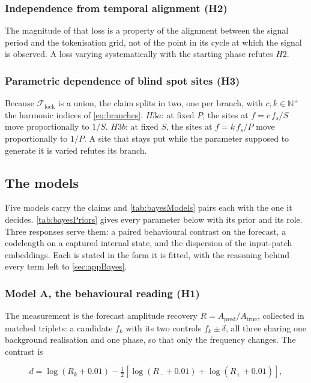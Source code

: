 \subsubsection*{Independence from temporal alignment (H2)}
The magnitude of that loss is a property of the alignment between the signal period and the tokenisation grid, not of the point in its cycle at which the signal is observed. A loss varying systematically with the starting phase refutes $H2$.

\subsubsection*{Parametric dependence of blind spot sites (H3)}
Because $\mathcal F_{\mathrm{lock}}$ is a union, the claim splits in two, one per branch, with $c,k\in\mathbb{N}^{+}$ the harmonic indices of \autoref{eq:branches}. $H3a$: at fixed $P$, the sites at $f=c\,f_s/S$ move proportionally to $1/S$. $H3b$: at fixed $S$, the sites at $f=k\,f_s/P$ move proportionally to $1/P$. A site that stays put while the parameter supposed to generate it is varied refutes its branch.



\subsection{The models}

Five models carry the claims and \autoref{tab:bayesModels} pairs each with the one it decides. \autoref{tab:bayesPriors} gives every parameter below with its prior and its role. Three responses serve them: a paired behavioural contrast on the forecast, a codelength on a captured internal state, and the dispersion of the input-patch embeddings. Each is stated in the form it is fitted, with the reasoning behind every term left to \autoref{sec:appBayes}.

\subsubsection*{Model A, the behavioural reading (H1)}
The measurement is the forecast amplitude recovery $R=A_{\mathrm{pred}}/A_{\mathrm{true}}$, collected in matched triplets: a candidate $f_k$ with its two controls $f_k\pm\delta$, all three sharing one background realisation and one phase, so that only the frequency changes. The contrast is

\begin{equation}
\label{eq:d2contrast}
d = \log(R_k + 0.01) - \tfrac{1}{2}\left[\log(R_- + 0.01) + \log(R_+ + 0.01)\right],
\end{equation}


